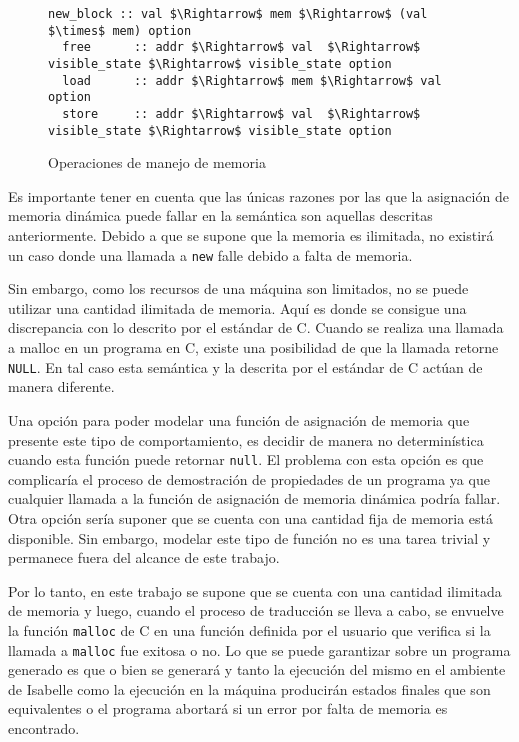 \begin{figure}
  \begin{lstlisting}[mathescape=true, frame=single]
  new_block :: val $\Rightarrow$ mem $\Rightarrow$ (val $\times$ mem) option
  free      :: addr $\Rightarrow$ val  $\Rightarrow$ visible_state $\Rightarrow$ visible_state option
  load      :: addr $\Rightarrow$ mem $\Rightarrow$ val option
  store     :: addr $\Rightarrow$ val  $\Rightarrow$ visible_state $\Rightarrow$ visible_state option
  \end{lstlisting}

  \caption{Operaciones de manejo de memoria}
  \label{fig:mem_operations}
\end{figure}

Es importante tener en cuenta que las únicas razones por las que la asignación de memoria dinámica puede fallar en la semántica son aquellas descritas anteriormente.
Debido a que se supone que la memoria es ilimitada, no existirá un caso donde una llamada a \verb|new| falle debido a falta de memoria.

Sin embargo, como los recursos de una máquina son limitados, no se puede utilizar una cantidad ilimitada de memoria.
Aquí es donde se consigue una discrepancia con lo descrito por el estándar de C.
Cuando se realiza una llamada a malloc en un programa en C, existe una posibilidad de que la llamada retorne \verb|NULL|.
En tal caso esta semántica y la descrita por el estándar de C actúan de manera diferente.

Una opción para poder modelar una función de asignación de memoria que presente este tipo de comportamiento, es decidir de manera no determinística cuando esta función puede retornar \verb|null|.
El problema con esta opción es que complicaría el proceso de demostración de propiedades de un programa ya que cualquier llamada a la función de asignación de memoria dinámica podría fallar.
Otra opción sería suponer que se cuenta con una cantidad fija de memoria está disponible.
Sin embargo, modelar este tipo de función no es una tarea trivial y permanece fuera del alcance de este trabajo.

Por lo tanto, en este trabajo se supone que se cuenta con una cantidad ilimitada de memoria y luego, cuando el proceso de traducción se lleva a cabo, se envuelve la función \verb|malloc| de C en una función definida por el usuario que verifica si la llamada a \verb|malloc| fue exitosa o no.
Lo que se puede garantizar sobre un programa generado es que o bien se generará y tanto la ejecución del mismo en el ambiente de Isabelle como la ejecución en la máquina producirán estados finales que son equivalentes o el programa abortará si un error por falta de memoria es encontrado.


